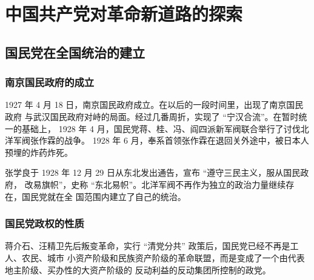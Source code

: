 \documentclass[10pt, UTF8]{book} %
\begin{document}



\section{中国共产党对革命新道路的探索}

\subsection{国民党在全国统治的建立}

\subsubsection{南京国民政府的成立}

1927 年 4 月 18 日，南京国民政府成立。在以后的一段时间里，出现了南京国民政府
与武汉国民政府对峙的局面。经过几番周折，实现了 “宁汉合流”。在暂时统一的基础上，
1928 年 4 月，国民党蒋、桂、冯、阎四派新军阀联合举行了讨伐北洋军阀张作霖的战争。
1928 年 6 月，奉系首领张作霖在退回关外途中，被日本人预埋的炸药炸死。

张学良于 1928 年 12 月 29 日从东北发出通告，宣布 “遵守三民主义，服从国民政府，
改易旗帜”，史称 “东北易帜”。北洋军阀不再作为独立的政治力量继续存在，国民党就在全
国范围内建立了自己的统治。

\subsubsection{国民党政权的性质}

蒋介石、汪精卫先后叛变革命，实行 “清党分共” 政策后，国民党已经不再是工人、农民、城市
小资产阶级和民族资产阶级的革命联盟，而是变成了一个由代表地主阶级、买办性的大资产阶级的
反动利益的反动集团所控制的政党。
\end{document}
